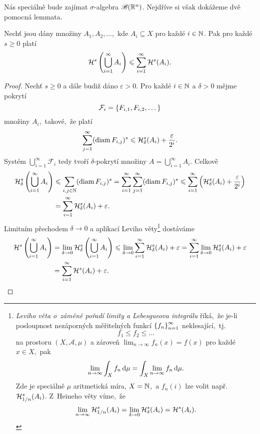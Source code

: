 Nás speciálně bude zajímat $\sigma$-algebra $\borelsigmaalgebra(\R^n)$. Nejdříve si však dokážeme dvě pomocná lemmata.
\begin{lemma}\label{lem:Hausdorffova-mira-subaditivita}
    Nechť jsou dány množiny $A_1,A_2,\ldots$,~kde $A_i\subseteq X$ pro každé $i\in\N$. Pak pro každé $s\geqslant 0$ platí
    \[\hausdorffmeasure{s}\left(\bigcup_{i=1}^\infty A_i\right)\leqslant\sum_{i=1}^{\infty}\hausdorffmeasure{s}(A_i).\]
\end{lemma}
\begin{proof}
    Nechť $s\geqslant 0$ a dále budiž dáno $\varepsilon>0$. Pro každé $i\in\N$ a $\delta>0$ mějme pokrytí
    \[\mathcal{F}_i=\set{F_{i,1},F_{i,2},\dots}\]
    množiny $A_i$,~takové,~že platí
    \[\sum_{j=1}^{\infty}(\diam{F_{i,j}})^s\leqslant\hausdorffdeltameasure{s}{\delta}(A_i)+\dfrac{\varepsilon}{2^i}.\]
    Systém $\bigcup_{i=1}^\infty\mathcal{F}_i$ tedy tvoří $\delta$-pokrytí množiny $A=\bigcup_{i=1}^\infty A_i$. Celkově
    \begin{align*}
        \hausdorffdeltameasure{s}{\delta}\left(\bigcup_{i=1}^\infty A_i\right)&\leqslant\sum_{i,j\in\N}(\diam{F_{i,j}})^s=\sum_{i=1}^{\infty}\sum_{j=1}^{\infty}(\diam{F_{i,j}})^s\leqslant\sum_{i=1}^{\infty}\left(\hausdorffdeltameasure{s}{\delta}(A_i)+\dfrac{\varepsilon}{2^i}\right)\\
        &=\sum_{i=1}^{\infty}\hausdorffdeltameasure{s}{\delta}(A_i)+\varepsilon.
    \end{align*}
    Limitním přechodem $\delta\to 0$ a aplikací Leviho věty\footnote{\emph{Leviho věta o~záměně pořadí limity a Lebesgueova integrálu} říká,~že je-li posloupnost nezáporných měřitelných funkcí $\set{f_n}_{n=1}^\infty$ neklesající,~tj.
    \[f_1\leqslant f_2\leqslant\dots\]
    na prostoru $(X,\mathcal{A},\mu)$ a zároveň $\lim_{n\to\infty}f_n(x)=f(x)$ pro každé $x\in X$,~pak
    \[\lim_{n\to\infty}\int_X f_n\dx[\mu]=\int_X \lim_{n\to\infty}f_n\dx[\mu].\]
    Zde je speciálně $\mu$ aritmetická míra, $X=\N$,~a $f_n(i)$ lze volit např. $\hausdorffdeltameasure{s}{1/n}(A_i)$. Z~Heineho věty víme,~že
    \[\lim_{n\to\infty}\hausdorffdeltameasure{s}{1/n}(A_i)=\lim_{\delta\to 0}\hausdorffdeltameasure{s}{\delta}(A_i)=\hausdorffmeasure{s}(A_i).\]
    }
    dostáváme
    \begin{align*}
        \hausdorffmeasure{s}\left(\bigcup_{i=1}^\infty A_i\right)&=\lim_{\delta\to 0}\hausdorffdeltameasure{s}{\delta}\left(\bigcup_{i=1}^\infty A_i\right)\leqslant\lim_{\delta\to 0}\sum_{i=1}^{\infty}\hausdorffdeltameasure{s}{\delta}(A_i)+\varepsilon=\sum_{i=1}^{\infty}\lim_{\delta\to 0}\hausdorffdeltameasure{s}{\delta}(A_i)+\varepsilon\\
        &=\sum_{i=1}^{\infty}\hausdorffmeasure{s}(A_i)+\varepsilon.
    \end{align*} 
\end{proof}
